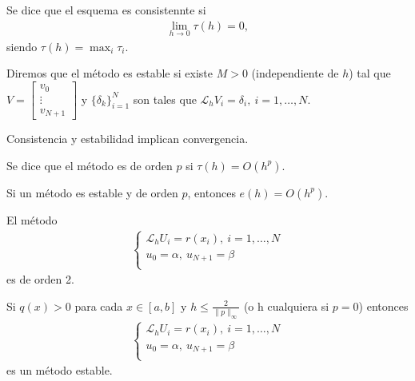 \begin{defi}
    Se dice que el esquema es consistennte si
    \begin{align*}
        \lim_{h \to 0} \tau(h) = 0,
    \end{align*}
    siendo $\tau(h) = \max_{i} \tau_i$.
\end{defi}

\begin{defi}
    Diremos que el método es estable si existe $M > 0$ (independiente de $h$) tal que $V = \begin{bmatrix}
            v_0    \\
            \vdots \\
            v_{N+1}
        \end{bmatrix}$ y $\{\delta_k\}_{i=1}^{N}$ son tales que $\mathcal{L}_hV_i = \delta_i, \ i = 1,\ldots,N$.
\end{defi}

\begin{teo}
    Consistencia y estabilidad implican convergencia.
\end{teo}

\begin{defi}
    Se dice que el método es de orden $p$ si $\tau(h) = O(h^p)$.
\end{defi}

\begin{teo}
    Si un método es estable y de orden $p$, entonces $e(h) = O(h^p)$.
\end{teo}

\begin{cor}
    El método
    \begin{align*}
        \left\{ \begin{array}{lcc}
                    \mathcal{L}_hU_i = r(x_i), \ i = 1,\ldots,N \\
                    u_0 = \alpha, \ u_{N+1} = \beta             \\
                \end{array}
        \right.
    \end{align*}
    es de orden 2.
\end{cor}

\begin{teo}
    Si $q(x) > 0$ para cada $x \in [a,b]$ y $h \leq \frac{2}{\|p\|_{\infty}}$ (o h cualquiera si $p = 0$) entonces
    \begin{align*}
        \left\{ \begin{array}{lcc}
                    \mathcal{L}_hU_i = r(x_i), \ i = 1,\ldots,N \\
                    u_0 = \alpha, \ u_{N+1} = \beta             \\
                \end{array}
        \right.
    \end{align*}
    es un método estable.
\end{teo}


